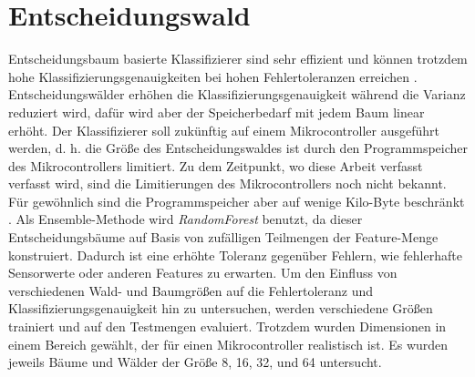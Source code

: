 \section{Entscheidungswald}
Entscheidungsbaum basierte Klassifizierer sind sehr effizient und können trotzdem hohe Klassifizierungsgenauigkeiten bei hohen Fehlertoleranzen erreichen \cite{dymelThesis}.
Entscheidungswälder erhöhen die Klassifizierungsgenauigkeit während die Varianz reduziert wird, dafür wird aber der Speicherbedarf mit jedem Baum linear erhöht.
Der Klassifizierer soll zukünftig auf einem Mikrocontroller ausgeführt werden, d. h. die Größe des Entscheidungswaldes ist durch den Programmspeicher des Mikrocontrollers limitiert.
Zu dem Zeitpunkt, wo diese Arbeit verfasst verfasst wird, sind die Limitierungen des Mikrocontrollers noch nicht bekannt.
Für gewöhnlich sind die Programmspeicher aber auf wenige Kilo-Byte beschränkt \cite{dymelThesis}.
\newline
\newline
Als Ensemble-Methode wird \textit{RandomForest} benutzt, da dieser Entscheidungsbäume auf Basis von zufälligen Teilmengen der Feature-Menge konstruiert.
Dadurch ist eine erhöhte Toleranz gegenüber Fehlern, wie fehlerhafte Sensorwerte oder anderen Features zu erwarten.
\newline
\newline
Um den Einfluss von verschiedenen Wald- und Baumgrößen auf die Fehlertoleranz und Klassifizierungsgenauigkeit hin zu untersuchen, werden verschiedene Größen
trainiert und auf den Testmengen evaluiert. Trotzdem wurden Dimensionen in einem Bereich gewählt, der für einen Mikrocontroller realistisch ist.
Es wurden jeweils Bäume und Wälder der Größe 8, 16, 32, und 64 untersucht.
